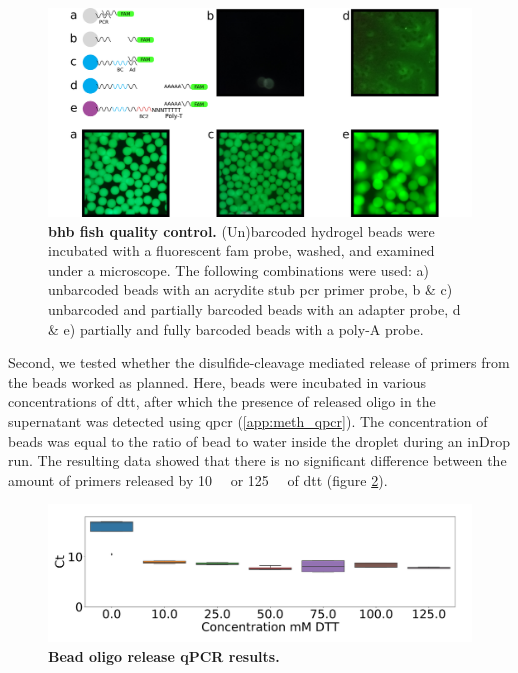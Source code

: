 \begin{figure}[ht]
\centerfloat
\includegraphics[width=\textwidth]{./ims/indrop_beadqcv2.png}
\caption[BHB FISH quality control]{\textbf{\acrshort{bhb} \acrshort{fish} quality control.} (Un)barcoded hydrogel beads were incubated with a fluorescent \acrshort{fam} probe, washed, and examined under a microscope. The following combinations were used: a) unbarcoded beads with an acrydite stub \acrshort{pcr}  primer probe, b \& c) unbarcoded and partially barcoded beads with an adapter probe, d \& e) partially and fully barcoded beads with a poly-A probe.}
 \label{fig:indrop_beadqcv2}
\end{figure}

Second, we tested whether the disulfide-cleavage mediated release of primers from the beads worked as planned. Here, beads were incubated in various concentrations of \acrshort{dtt}, after which the presence of released oligo in the supernatant was detected using \acrshort{qpcr} (\ref{app:meth_qpcr}). The concentration of beads was equal to the ratio of bead to water inside the droplet during an inDrop run. The resulting data showed that there is no significant difference between the amount of primers released by \SI{10}{\milli\molar} or \SI{125}{\milli\molar} of \acrshort{dtt} (figure \ref{fig:indrop_qpcr}).\pms

\begin{figure}[ht]
\centerfloat
\includegraphics[width=\textwidth]{./ims/indrop_qpcr.png}
\caption[Bead oligo release qPCR results]{\textbf{Bead oligo release qPCR results.}}
\label{fig:indrop_qpcr}
\end{figure}

